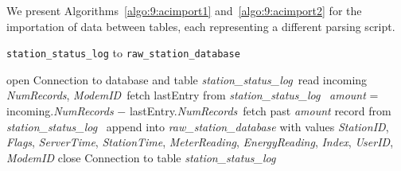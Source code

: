 We present Algorithms~\ref{algo:9:acimport1} and~\ref{algo:9:acimport2} for the importation of data between tables, each representing a different parsing script. 

\begin{algorithm}[H]
	\begin{flushleft}
		\caption{\texttt{station\_status\_log} to \texttt{raw\_station\_database}}\label{algo:9:acimport1}
		\begin{algorithmic}[1]
			\State open Connection to database and table \textit{station\_status\_log}\
			\State read incoming \textit{NumRecords}, \textit{ModemID}\
			\State fetch lastEntry from \textit{station\_status\_log}\
			\State \textit{amount} = incoming.\textit{NumRecords} $-$ lastEntry.\textit{NumRecords}\
			\State fetch past \textit{amount} record from \textit{station\_status\_log}\
			\State append into \textit{raw\_station\_database} with values \textit{StationID}, \textit{Flags}, \hspace*{18mm}\textit{ServerTime}, \textit{StationTime}, \textit{MeterReading}, \textit{EnergyReading}, \textit{Index}, \textit{UserID}, \hspace*{18mm}\textit{ModemID}
			\EndFor
			\EndWhile
			\State close Connection to table \textit{station\_status\_log}\
			\EndProcedure
		\end{algorithmic}
	\end{flushleft}
\end{algorithm}

